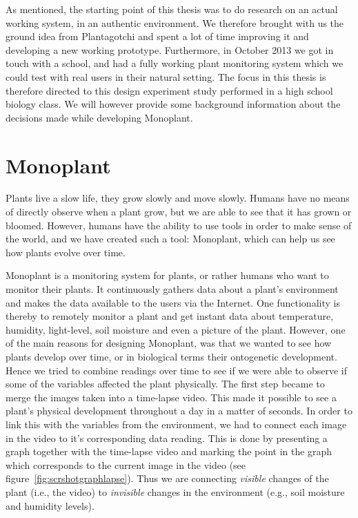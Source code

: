 As mentioned, the starting point of this thesis was to do research on an actual working system, in an authentic environment. We therefore brought with us the ground idea from Plantagotchi and spent a lot of time improving it and developing a new working prototype. Furthermore, in October 2013 we got in touch with a school, and had a fully working plant monitoring system which we could test with real users in their natural setting. The focus in this thesis is therefore directed to this design experiment study performed in a high school biology class. We will however provide some background information about the decisions made while developing Monoplant. 


\section{Monoplant}
Plants live a slow life, they grow slowly and move slowly. Humans have no means of directly observe when a plant grow, but we are able to see that it has grown or bloomed. However, humans have the ability to use tools in order to make sense of the world, and we have created such a tool: Monoplant, which can help us see how plants evolve over time.

Monoplant is a monitoring system for plants, or rather humans who want to monitor their plants. It continuously gathers data about a plant's environment and makes the data available to the users via the Internet. One functionality is thereby to remotely monitor a plant and get instant data about temperature, humidity, light-level, soil moisture and even a picture of the plant. However, one of the main reasons for designing Monoplant, was that we wanted to see how plants develop over time, or in biological terms their ontogenetic development. Hence we tried to combine readings over time to see if we were able to observe if some of the variables affected the plant physically. The first step became to merge the images taken into a time-lapse video. This made it possible to see a plant's physical development throughout a day in a matter of seconds. In order to link this with the variables from the environment, we had to connect each image in the video to it's corresponding data reading. This is done by presenting a graph together with the time-lapse video and marking the point in the graph which corresponds to the current image in the video (see figure~\ref{fig:scrshotgraphlapse}). Thus we are connecting \emph{visible} changes of the plant (i.e., the video) to \emph{invisible} changes in the environment (e.g., soil moisture and humidity levels).


